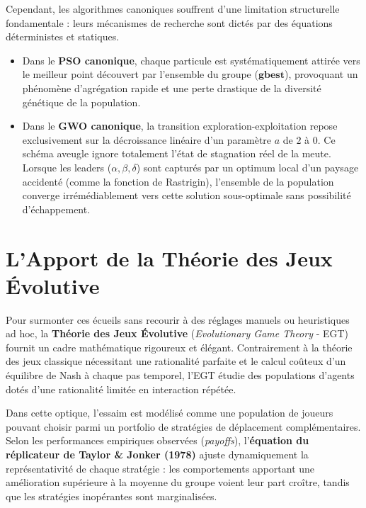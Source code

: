 Cependant, les algorithmes canoniques souffrent d'une limitation structurelle fondamentale : leurs mécanismes de recherche sont dictés par des équations déterministes et statiques. 
\begin{itemize}[label=\textbullet]
    \item Dans le \textbf{PSO canonique}, chaque particule est systématiquement attirée vers le meilleur point découvert par l'ensemble du groupe ($\mathbf{gbest}$), provoquant un phénomène d'agrégation rapide et une perte drastique de la diversité génétique de la population.
    \item Dans le \textbf{GWO canonique}, la transition exploration-exploitation repose exclusivement sur la décroissance linéaire d'un paramètre $a$ de $2$ à $0$. Ce schéma aveugle ignore totalement l'état de stagnation réel de la meute. Lorsque les leaders ($\alpha, \beta, \delta$) sont capturés par un optimum local d'un paysage accidenté (comme la fonction de Rastrigin), l'ensemble de la population converge irrémédiablement vers cette solution sous-optimale sans possibilité d'échappement.
\end{itemize}

\section{L'Apport de la Théorie des Jeux Évolutive}
Pour surmonter ces écueils sans recourir à des réglages manuels ou heuristiques ad hoc, la \textbf{Théorie des Jeux Évolutive} (\textit{Evolutionary Game Theory} - EGT) \cite{weibull1995evolutionary} fournit un cadre mathématique rigoureux et élégant. Contrairement à la théorie des jeux classique nécessitant une rationalité parfaite et le calcul coûteux d'un équilibre de Nash à chaque pas temporel, l'EGT étudie des populations d'agents dotés d'une rationalité limitée en interaction répétée.

Dans cette optique, l'essaim est modélisé comme une population de joueurs pouvant choisir parmi un portfolio de stratégies de déplacement complémentaires. Selon les performances empiriques observées (\textit{payoffs}), l'\textbf{équation du réplicateur de Taylor \& Jonker (1978)} \cite{taylor1978evolutionary} ajuste dynamiquement la représentativité de chaque stratégie : les comportements apportant une amélioration supérieure à la moyenne du groupe voient leur part croître, tandis que les stratégies inopérantes sont marginalisées.

